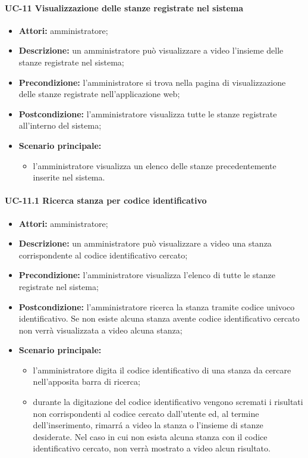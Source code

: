 \paragraph{UC-11 Visualizzazione delle stanze registrate nel sistema}
\begin{itemize}
    \item \textbf{Attori:} amministratore;
    \item \textbf{Descrizione:} un amministratore pu\`{o} visualizzare a video l'insieme delle stanze registrate nel sistema;
    \item \textbf{Precondizione:} l'amministratore si trova nella pagina di visualizzazione delle stanze registrate nell'applicazione web;
    \item \textbf{Postcondizione:} l'amministratore visualizza tutte le stanze registrate all'interno del sistema;
    \item \textbf{Scenario principale:}
    \begin{itemize}
        \item l'amministratore visualizza un elenco delle stanze precedentemente inserite nel sistema.
    \end{itemize}
\end{itemize}


\paragraph{UC-11.1 Ricerca stanza per codice identificativo}
\begin{itemize}
    \item \textbf{Attori:} amministratore;
    \item \textbf{Descrizione:} un amministratore pu\`{o} visualizzare a video una stanza corrispondente al codice identificativo cercato;
    \item \textbf{Precondizione:} l'amministratore visualizza l'elenco di tutte le stanze registrate nel sistema;
    \item \textbf{Postcondizione:} l'amministratore ricerca la stanza tramite codice univoco identificativo. Se non esiste alcuna stanza avente codice identificativo cercato non verrà visualizzata a video alcuna stanza;
    \item \textbf{Scenario principale:}
    \begin{itemize}
        \item l'amministratore digita il codice identificativo di una stanza da cercare nell'apposita barra di ricerca;
        \item durante la digitazione del codice identificativo vengono scremati i risultati non corrispondenti al codice cercato dall'utente ed, al termine dell'inserimento, rimarr\'{a} a video la stanza o l'insieme di stanze desiderate. Nel caso in cui non esista alcuna stanza con il codice identificativo cercato, non verrà mostrato a video alcun risultato.
    \end{itemize}
\end{itemize}

